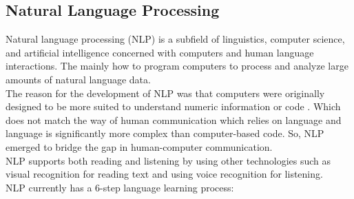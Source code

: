 \documentclass[12pt,oneside,openright,a4paper]{cpe-english-project}
\begin{document}
\subsection{Natural Language Processing}
Natural language processing (NLP) is a subfield of linguistics, computer science, and artificial
intelligence concerned with computers and human language interactions. The mainly how to program
computers to process and analyze large amounts of natural language data.\\
The reason for the development of NLP was that computers were originally designed to be more suited
to understand numeric information or code \cite{nlp_technology}. Which does not match the way of human
communication which relies on language and language is significantly more complex than computer-based
code. So, NLP emerged to bridge the gap in human-computer communication.\\
NLP supports both reading and listening by using other technologies such as visual recognition for
reading text and using voice recognition for listening.\\
NLP currently has a 6-step language learning process:
\end{document}
